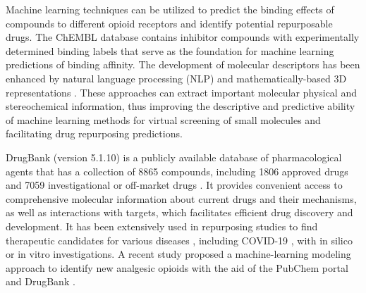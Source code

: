 \documentclass[10pt]{article}
\begin{document}
		Machine learning techniques can be utilized to predict the binding effects of compounds to different opioid receptors and identify potential repurposable drugs. The ChEMBL database \cite{gaulton2017chembl} contains inhibitor compounds with experimentally determined binding labels that serve as the foundation for machine learning predictions of binding affinity. The development of molecular descriptors has been enhanced by natural language processing (NLP) \cite{chen2021extracting, winter2019learning} and mathematically-based 3D representations \cite{feng2023virtual}. These approaches can extract important molecular physical and stereochemical information, thus improving the descriptive and predictive ability of machine learning methods for virtual screening of small molecules and facilitating drug repurposing predictions.
		
		
		
		
		
		DrugBank (version 5.1.10) is a publicly available database of pharmacological agents that has a collection of 8865 compounds, including 1806 approved drugs and 7059 investigational or off-market drugs \cite{wishart2018drugbank}. It provides convenient access to comprehensive molecular information about current drugs and their mechanisms, as well as  interactions with targets, which facilitates efficient drug discovery and development. It has been extensively used in repurposing studies to find therapeutic candidates for various diseases \cite{lesmana2022genomic,singh2017drug,adikusuma2021drug}, including COVID-19 \cite{mahdian2020drug,gao2020repositioning}, with in silico or in vitro investigations. A recent study proposed a machine-learning modeling approach to identify new analgesic opioids with the aid of the PubChem portal and DrugBank \cite{jia2021construction}.
		
		
		
		
		
		
		
\end{document}
